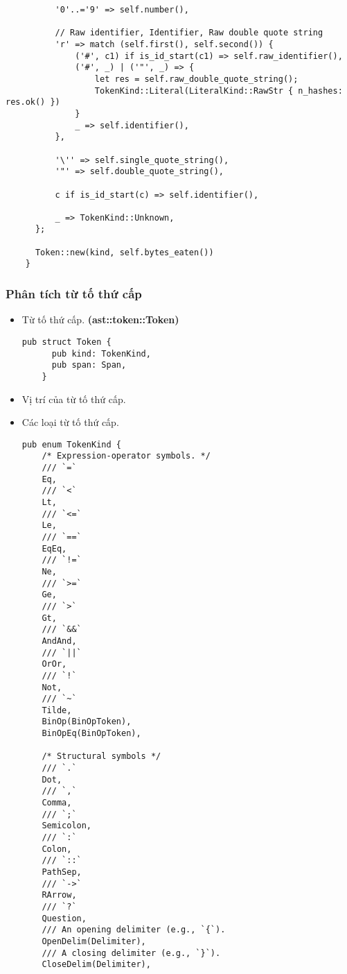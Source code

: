 {\begin{itemize}
\begin{lstlisting}
          '0'..='9' => self.number(),

          // Raw identifier, Identifier, Raw double quote string
          'r' => match (self.first(), self.second()) {
              ('#', c1) if is_id_start(c1) => self.raw_identifier(),
              ('#', _) | ('"', _) => {
                  let res = self.raw_double_quote_string();
                  TokenKind::Literal(LiteralKind::RawStr { n_hashes: res.ok() })
              }
              _ => self.identifier(),
          },

          '\'' => self.single_quote_string(),
          '"' => self.double_quote_string(),

          c if is_id_start(c) => self.identifier(),

          _ => TokenKind::Unknown,
      };

      Token::new(kind, self.bytes_eaten())
    }
  \end{lstlisting}
\end{itemize}

\subsubsection{Phân tích từ tố thứ cấp}
\begin{itemize}
  \item \label{ap1:flex_token}Từ tố thứ cấp. \textbf{(ast::token::Token)}
  \begin{lstlisting}[]
    pub struct Token {
      pub kind: TokenKind,
      pub span: Span,
    }
  \end{lstlisting}
  \item \label{ap1:flex_token_span}Vị trí của từ tố thứ cấp.
  \item \label{ap1:flex_token_kind}Các loại từ tố thứ cấp.
\begin{lstlisting}
pub enum TokenKind {
    /* Expression-operator symbols. */
    /// `=`
    Eq,
    /// `<`
    Lt,
    /// `<=`
    Le,
    /// `==`
    EqEq,
    /// `!=`
    Ne,
    /// `>=`
    Ge,
    /// `>`
    Gt,
    /// `&&`
    AndAnd,
    /// `||`
    OrOr,
    /// `!`
    Not,
    /// `~`
    Tilde,
    BinOp(BinOpToken),
    BinOpEq(BinOpToken),
    
    /* Structural symbols */
    /// `.`
    Dot,
    /// `,`
    Comma,
    /// `;`
    Semicolon,
    /// `:`
    Colon,
    /// `::`
    PathSep,
    /// `->`
    RArrow,
    /// `?`
    Question,
    /// An opening delimiter (e.g., `{`).
    OpenDelim(Delimiter),
    /// A closing delimiter (e.g., `}`).
    CloseDelim(Delimiter),
    

\end{lstlisting}
\end{itemize}}
